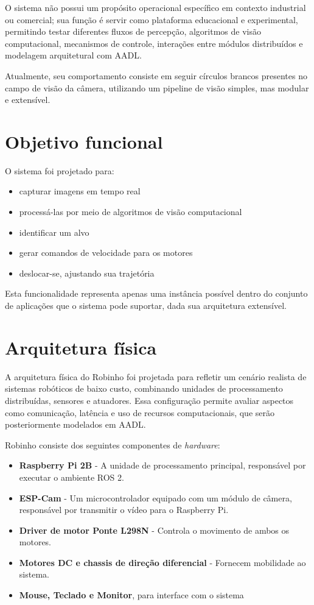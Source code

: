 O sistema não possui um propósito operacional específico em contexto industrial ou comercial; sua função é servir como plataforma educacional e experimental, permitindo testar diferentes fluxos de percepção, algoritmos de visão computacional, mecanismos de controle, interações entre módulos distribuídos e modelagem arquitetural com AADL.

Atualmente, seu comportamento consiste em seguir círculos brancos presentes no campo de visão da câmera, utilizando um pipeline de visão simples, mas modular e extensível.

\section{Objetivo funcional}
O sistema foi projetado para:

\begin{itemize}
    \item capturar imagens em tempo real
    \item processá-las por meio de algoritmos de visão computacional 
    \item identificar um alvo 
    \item gerar comandos de velocidade para os motores 
    \item deslocar-se, ajustando sua trajetória
\end{itemize}

Esta funcionalidade representa apenas uma instância possível dentro do conjunto de aplicações que o sistema pode suportar, dada sua arquitetura extensível.

\section{Arquitetura física}

A arquitetura física do Robinho foi projetada para refletir um cenário realista de sistemas robóticos de baixo custo, combinando unidades de processamento distribuídas, sensores e atuadores. Essa configuração permite avaliar aspectos como comunicação, latência e uso de recursos computacionais, que serão posteriormente modelados em AADL.

Robinho consiste dos seguintes componentes de \textit{hardware}: 
\begin{itemize}
    \item \textbf{Raspberry Pi 2B} - A unidade de processamento principal, responsável por executar o ambiente ROS 2.
    \item \textbf{ESP-Cam} - Um microcontrolador equipado com um módulo de câmera, responsável por transmitir o vídeo para o Raspberry Pi.
    \item \textbf{Driver de motor Ponte L298N} - Controla o movimento de ambos os motores.
    \item \textbf{Motores DC e chassis de direção diferencial} - Fornecem mobilidade ao sistema.
    \item \textbf{Mouse, Teclado e Monitor}, para interface com o sistema
\end{itemize}

